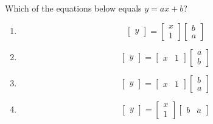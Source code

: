 \documentclass[11pt]{article}
\begin{document}
Which of the equations below equals $y = ax + b$?
\begin{enumerate}
    \item{ \begin{equation*}
            \begin{bmatrix}
                y  
            \end{bmatrix}
            = 
            \begin{bmatrix}
                x \\ 1 
            \end{bmatrix}
            \begin{bmatrix}
                b \\ a
            \end{bmatrix}
    \end{equation*} }
    \item{ \begin{equation*}
            \begin{bmatrix}
                y
            \end{bmatrix}
            = 
            \begin{bmatrix}
                x & 1 
            \end{bmatrix}
            \begin{bmatrix}
                a \\ b
            \end{bmatrix}
    \end{equation*} }
    \item{ \begin{equation*}
            \begin{bmatrix}
                y  
            \end{bmatrix}
            = 
            \begin{bmatrix}
                x & 1 
            \end{bmatrix}
            \begin{bmatrix}
                b \\ a
            \end{bmatrix}
    \end{equation*} }
    \item{ \begin{equation*}
            \begin{bmatrix}
                y  
            \end{bmatrix}
            = 
            \begin{bmatrix}
                x \\ 1 
            \end{bmatrix}
            \begin{bmatrix}
                b & a
            \end{bmatrix}
    \end{equation*} }
\end{enumerate}
\end{document}

